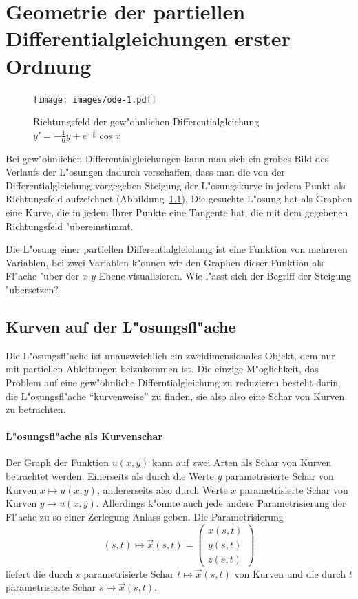 %
%
%
\chapter{Geometrie der partiellen Differentialgleichungen erster Ordnung\label{chapter-geometrie}}
\begin{figure}
\begin{center}
\texttt{[image: images/ode-1.pdf]}
\end{center}
\caption{Richtungsfeld der gew"ohnlichen Differentialgleichung
$y'=-\frac16y+e^{-\frac{x}6}\cos x$ \label{geometrie:ode}}
\end{figure}
Bei gew"ohnlichen Differentialgleichungen kann man sich ein grobes
Bild des Verlaufs der L"osungen dadurch verschaffen, dass man
die von der Differentialgleichung vorgegeben Steigung der L"osungskurve
in jedem Punkt als Richtungsfeld aufzeichnet (Abbildung~\ref{geometrie:ode}).
Die gesuchte L"osung hat als Graphen eine Kurve, die in jedem Ihrer Punkte eine
Tangente hat, die mit dem gegebenen Richtungsfeld "ubereinstimmt.

Die L"osung einer
partiellen Differentialgleichung ist eine Funktion von mehreren Variablen,
bei zwei Variablen k"onnen wir den Graphen dieser Funktion als Fl"ache
"uber der $x$-$y$-Ebene visualisieren. Wie l"asst sich der Begriff der
Steigung "ubersetzen?


\section{Kurven auf der L"osungsfl"ache}
Die L"osungsfl"ache ist unausweichlich ein zweidimensionales
Objekt, dem nur mit partiellen Ableitungen beizukommen ist.
Die einzige M"oglichkeit, das Problem auf eine gew"ohnliche
Differntialgleichung zu reduzieren besteht darin, die L"osungsfl"ache
``kurvenweise'' zu finden, sie also also eine Schar von Kurven
zu betrachten.

\subsubsection{L"osungsfl"ache als Kurvenschar}
Der Graph der Funktion $u(x,y)$ kann auf zwei Arten als Schar von
Kurven betrachtet werden. Einerseits als durch die Werte $y$
parametrisierte Schar von Kurven $x\mapsto u(x,y)$, andererseits
also durch Werte $x$ parametrisierte Schar von Kurven $y\mapsto u(x,y)$.
Allerdings k"onnte auch jede andere Parametrisierung der Fl"ache
zu so einer Zerlegung Anlass geben. Die Parametrisierung
\begin{equation}
(s,t)\mapsto \vec x(s,t)
=
\begin{pmatrix}x(s,t)\\y(s,t)\\z(s,t)\end{pmatrix}
\label{quasilinear:kurvenschar}
\end{equation}
liefert die durch $s$ parametrisierte Schar $t\mapsto \vec x(s,t)$
von Kurven und die durch $t$ parametrisierte Schar $s\mapsto\vec x(s,t)$.


